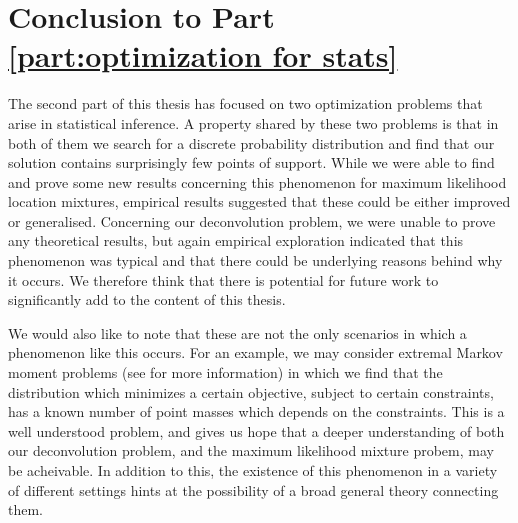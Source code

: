 \chapter{Conclusion to Part \ref{part:optimization for stats}}
\label{Ch:StatisticalOptimizationConclusion}


\graphicspath{{Figures/Mixtures/}}


The second part of this thesis has focused on two optimization problems that arise in statistical inference. A property shared by these two problems is that in both of them we search for a discrete probability distribution and find that our solution contains surprisingly few points of support. While we were able to find and prove some new results concerning this phenomenon for maximum likelihood location mixtures, empirical results suggested that these could be either improved or generalised. Concerning our deconvolution problem, we were unable to prove any theoretical results, but again empirical exploration indicated that this phenomenon was typical and that there could be underlying reasons behind why it occurs. We therefore think that there is potential for future work to significantly add to the content of this thesis. 

We would also like to note that these are not the only scenarios in which a phenomenon like this occurs. For an example, we may consider extremal Markov moment problems (see \cite{Krein1977-ak} for more information) in which we find that the distribution which minimizes a certain objective, subject to certain constraints, has a known number of point masses which depends on the constraints. This is a well understood problem, and gives us hope that a deeper understanding of both our deconvolution problem, and the maximum likelihood mixture probem, may be acheivable. In addition to this, the existence of this phenomenon in a variety of different settings hints at the possibility of a broad general theory connecting them.

